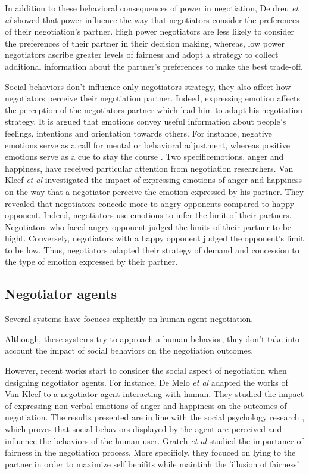 \documentclass[runningheads,a4paper]{llncs}
\begin{document}
			In addition to these behavioral consequences of power in negotiation, De dreu  \textit{et al} \cite{de2004influence,fiske1993controlling} showed that power influence the way that negotiators consider the preferences of their negotiation's partner. High power negotiators are less likely to consider the preferences of their partner in their decision making, whereas, low power negotiators ascribe greater levels of fairness and adopt a strategy to collect additional information about the partner's preferences \cite{de2004influence} to make the best trade-off.
			
			Social behaviors don't influence only  negotiators strategy, they also affect how negotiators perceive their negotiation partner. Indeed, expressing emotion affects the perception of the negotiators partner which lead him to adapt his negotiation strategy. It is argued that emotions convey useful information about people’s feelings, intentions and orientation towards others. For instance, negative emotions serve as a call for
			mental or behavioral adjustment, whereas positive emotions serve as a cue to stay the course \cite{cacioppo1999emotion}. Two specificemotions, anger and happiness, have received particular attention from negotiation researchers. Van Kleef \textit{et al} investigated the impact of expressing emotions of anger and happiness on the way that a negotiator perceive the emotion expressed by his partner\cite{van2006power}. They revealed that negotiators concede more to angry opponents compared to happy opponent. Indeed, negotiators use emotions to infer the limit of their partners. Negotiators who faced angry opponent judged the limits of their partner to be hight. Conversely, negotiators with a happy opponent judged the opponent’s limit to be low. Thus, negotiators adapted their strategy of demand and concession to the type of emotion expressed by their partner.
			
			\subsection{Negotiator agents}
			
			Several systems have focuces explicitly on human-agent negotiation. 
			
			Although, these systems try to approach a human behavior, they don't take into account the impact of social behaviors on the negotiation outcomes. 
			
			However, recent works start to consider the social aspect of negotiation when designing negotiator agents. For instance, De Melo \textit{et al} \cite{de2011effect} adapted the works of Van Kleef to a negotiator agent interacting with human. They studied the impact of expressing non verbal emotions of anger and happiness on the outcomes of negotiation. The results presented are in line with the social psychology research \cite{van2006power}, which proves that social behaviors displayed by the agent are perceived and influence the behaviors of the human user. Gratch \textit{et al} studied the importance of fairness in the negotiation process. More specificly, they focuced on lying to the partner in order to maximize self benifits while maintinh the 'illusion of fairness'.
			
\end{document}

